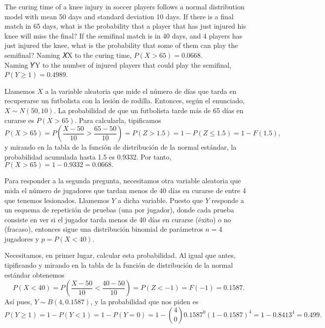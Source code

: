 {The curing time of a knee injury in soccer players follows a normal distribution model with mean 50 days and standard deviation 10 days. 
If there is a final match in 65 days, what is the probability that a player that has just injured his knee will miss the final? 
If the semifinal match is in 40 days, and 4 players has just injured the knee, what is the probability that some of them can play the semifinal?
}
{Naming 𝑋X to the curing time, $P(X>65)=0.0668$.\\
Naming 𝑌Y to the number of injured players that could play the semifinal, $P(Y\geq 1)=0.4989$.
}
{Llamemos $X$ a la variable aleatoria que mide el número de días que tarda en recuperarse un futbolista con la lesión de rodilla. Entonces,
según el enunciado, $X\sim N(50,10)$. La probabilidad de que un futbolista tarde más de 65 días en curarse es $P(X>65)$. Para calcularla, tipificamos
\[
P(X>65)=P(\frac{X-50}{10}>\frac{65-50}{10})=P(Z>1.5)=1-P(Z\leq 1.5)=1-F(1.5),
\]
y mirando en la tabla de la función de distribución de la normal estándar, la probabilidad acumulada hasta 1.5 es 0.9332. Por tanto,
$P(X>65)=1-0.9332=0.0668.$

Para responder a la segunda pregunta, necesitamos otra variable aleatoria que mida el número de jugadores que tardan menos de 40 días en
curarse de entre 4 que tenemos lesionados. Llamemos $Y$ a dicha variable. Puesto que $Y$ responde a un esquema de repetición de pruebas (una
por jugador), donde cada prueba consiste en ver si el jugador tarda menos de 40 días en curarse (éxito) o no (fracaso), entonces sigue una
distribución binomial de parámetros $n=4$ jugadores y $p=P(X<40)$.

Necesitamos, en primer lugar, calcular esta probabilidad. Al igual que antes, tipificando y mirando en la tabla de la función de
distribución de la normal estándar obtenemos
\[
P(X<40)=P(\frac{X-50}{10}<\frac{40-50}{10})=P(Z<-1)=F(-1)=0.1587.
\]
Así pues, $Y\sim B(4,0.1587)$, y la probabilidad que nos piden es
\[
P(Y\geq 1)=1-P(Y<1)=1-P(Y=0)=1-\binom{4}{0}0.1587^0 (1-0.1587)^4=1-0.8413^4=0.499.
\]
}


